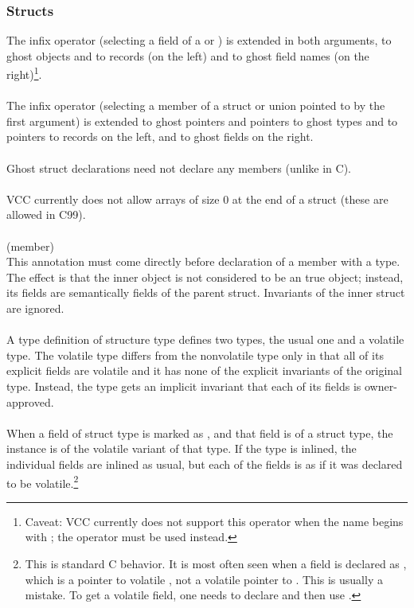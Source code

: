 \documentclass[preprint,nocopyrightspace]{sigplanconf}
\begin{document}
{{{\subsubsection{Structs}

The infix  operator (selecting a field of a 
or ) is extended in both arguments, to ghost objects and to
records (on the left) and to ghost field names (on the right)\footnote{
Caveat: VCC currently does not support this operator when the name begins
with \vcc{\ }; the \vcc{->} operator must be used instead.}.
\\\\
The infix \vcc{->} operator (selecting a member of a struct or union
pointed to by the first argument) is extended to ghost pointers and
pointers to ghost types and to pointers to records on the left, and to
ghost fields on the right.
\\\\
Ghost struct declarations need not declare any members (unlike in C).
\\\\
VCC currently does not allow arrays of size 0 at the end of a struct
(these are allowed in C99).
\\\\
 (member)\\
This annotation must come directly before declaration of a member with
a  type. The effect is that the inner object is not considered to be an
true object; instead, its fields are semantically fields of the
parent struct. Invariants of the inner struct are ignored.
\\\\
A type definition of structure type defines two types, the usual one
and a volatile type. The volatile type differs from the nonvolatile
type only in that all of its explicit fields are volatile and it has
none of the explicit invariants of the original type. Instead, the
type gets an implicit invariant that each of its fields is
owner-approved. 
\\\\
When a field of struct type is marked as , and that
field is of a struct type, the instance is of the volatile variant of
that type. If the type is inlined, the individual fields are inlined
as usual, but each of the fields is as if it was declared to be
volatile.\footnote{
This is standard C behavior. It is most often seen when a field is
declared as , which is a pointer to volatile ,
not a volatile pointer to . This is usually a mistake.
To get a volatile field, one needs to declare 
and then use .
}

}}}
\end{document}
